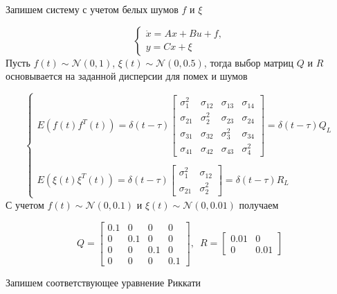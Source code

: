 Запишем систему с учетом белых шумов $f$ и $\xi$

\begin{equation}
	\begin{cases}
		\dot{x} = Ax + Bu + f,\\
		y = Cx + \xi
	\end{cases}
\end{equation}
Пусть $f(t) \sim \mathcal{N}(0,1)$, $\xi (t) \sim \mathcal{N}(0,0.5)$, тогда выбор матриц $Q$ и $R$ основывается на заданной дисперсии для помех и шумов

\begin{equation}
	\begin{cases}
		E \left( f(t) f^T(t) \right) = \delta (t - \tau)
		\begin{bmatrix}
			\sigma^2_1 & \sigma_{12} & \sigma_{13} & \sigma_{14}\\
			\sigma_{21} & \sigma^2_{2} & \sigma_{23} & \sigma_{24}\\
			\sigma_{31} & \sigma_{32} & \sigma^2_{3} & \sigma_{34}\\
			\sigma_{41} & \sigma_{42} & \sigma_{43} & \sigma^2_{4}
		\end{bmatrix} = \delta(t-\tau) Q_L\\\\
		E \left( \xi(t) \xi^T(t) \right) =
		\delta (t - \tau)
		\begin{bmatrix}
			\sigma^2_1 & \sigma_{12}\\
			\sigma_{21} & \sigma^2_{2} 
		\end{bmatrix} = \delta(t-\tau) R_L
	\end{cases}
\end{equation}
С учетом $ f(t) \sim \mathcal{N}(0,0.1)$ и $ \xi(t)  \sim \mathcal{N}(0,0.01)$ получаем

\begin{equation}
	Q = \begin{bmatrix}
		0.1 & 0 & 0 & 0\\
		0 & 0.1 & 0 & 0\\
		0 & 0 & 0.1 & 0\\
		0 & 0 & 0 & 0.1
	\end{bmatrix}, \, \, \, 
	R=
	\begin{bmatrix}
		0.01 & 0\\
		0 & 0.01
	\end{bmatrix}
\end{equation}




Запишем соответствующее уравнение Риккати

